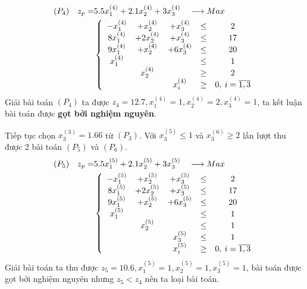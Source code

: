 \documentclass[12pt,a4paper]{report}
\begin{document}
    \begin{equation*}
      \begin{split}
          (P_4) \quad z_p= & 5.5x^{(4)}_1 + 2.1x^{(4)}_2 + 3x^{(4)}_3 \quad \longrightarrow Max \\
          & \left\{\begin{array} {ccccc}
           -x^{(4)}_1 &+ x^{(4)}_2 &+ x^{(4)}_3 &\leq& 2 \\
           8x^{(4)}_1 &+ 2x^{(4)}_2 &+ x^{(4)}_3&\leq& 17 \\
           9x^{(4)}_1 &+ x^{(4)}_2 &+ 6x^{(4)}_3 &\leq& 20 \\
           x^{(4)}_1 &&&\leq& 1 \\
           &x^{(4)}_2 &&\geq& 2 \\
          &&x^{(4)}_i &\geq& 0 , \: i=\overline{\rm 1 ,3} \\
          \end{array}\right. \\
      \end{split}
    \end{equation*}
    Giải bài toán $(P_4)$ ta được $z_4=12.7, x^{(4)}_1=1, x^{(4)}_2=2, x^{(4)}_3=1$, ta kết luận bài toán được  \textbf{gọt bởi nghiệm nguyên}.
    
    
    
    Tiếp tục chọn $x^{(3)}_3=1.66$ từ $(P_3)$. Với $x^{(5)}_3 \leq 1$ và $x^{(6)}_3 \geq 2$ lần lượt thu được 2 bài toán $(P_5)$ và $(P_6)$.
    \begin{equation*}
      \begin{split}
          (P_5) \quad z_p= & 5.5x^{(5)}_1 + 2.1x^{(5)}_2 + 3x^{(5)}_3 \quad \longrightarrow Max \\
          & \left\{\begin{array} {ccccc}
           -x^{(5)}_1&+ x^{(5)}_2 &+ x^{(5)}_3 &\leq& 2 \\
           8x^{(5)}_1 &+ 2x^{(5)}_2 &+ x^{(5)}_3&\leq& 17 \\
           9x^{(5)}_1 &+ x^{(5)}_2 &+ 6x^{(5)}_3 &\leq& 20 \\
           x^{(5)}_1 &&&\leq& 1 \\
           &x^{(5)}_2 &&\leq &1 \\
           &&x^{(5)}_3 &\leq& 1 \\
          &&x^{(5)}_i &\geq& 0 , \: i=\overline{\rm 1 ,3} \\
          \end{array}\right. \\
      \end{split}
    \end{equation*}
    Giải bài toán ta thu được $z_5=10.6, x^{(5)}_1=1, x^{(5)}_2=1, x^{(5)}_3=1$, bài toán được gọt bởi nghiệm nguyên nhưng $z_5<z_4$ nên ta loại bài toán.
    
\end{document}
